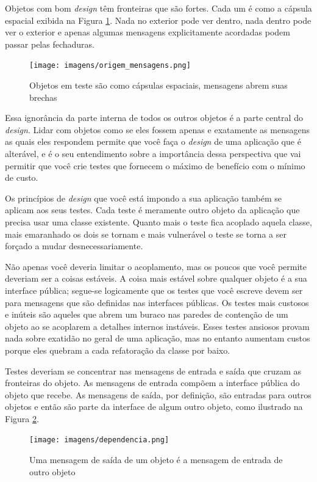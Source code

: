Objetos com bom \textit{design} têm fronteiras que são fortes. Cada um é como a cápsula espacial exibida na Figura \ref{img:origem_mensagens}. Nada no exterior pode ver dentro, nada dentro pode ver o exterior e apenas algumas mensagens explicitamente acordadas podem passar pelas fechaduras.

\begin{figure}[!htbp]
  \center
  \texttt{[image: imagens/origem\_mensagens.png]}
  \caption{Objetos em teste são como cápsulas espaciais, mensagens abrem suas brechas}
  \label{img:origem_mensagens}
\end{figure}

Essa ignorância da parte interna de todos os outros objetos é a parte central do \textit{design}. Lidar com objetos como se eles fossem apenas e exatamente as mensagens as quais eles respondem permite que você faça o \textit{design} de uma aplicação que é alterável, e é o seu entendimento sobre a importância dessa perspectiva que vai permitir que você crie testes que fornecem o máximo de benefício com o mínimo de custo.

Os princípios de \textit{design} que você está impondo a sua aplicação também se aplicam aos seus testes. Cada teste é meramente outro objeto da aplicação que precisa usar uma classe existente. Quanto mais o teste fica acoplado aquela classe, mais emaranhado os dois se tornam e mais vulnerável o teste se torna a ser forçado a mudar desnecessariamente.

Não apenas você deveria limitar o acoplamento, mas os poucos que você permite deveriam ser a coisas estáveis. A coisa mais estável sobre qualquer objeto é a sua interface pública; segue-se logicamente que os testes que você escreve devem ser para mensagens que são definidas nas interfaces públicas. Os testes mais custosos e inúteis são aqueles que abrem um buraco nas paredes de contenção de um objeto ao se acoplarem a detalhes internos instáveis. Esses testes ansiosos provam nada sobre exatidão no geral de uma aplicação, mas no entanto aumentam custos porque eles quebram a cada refatoração da classe por baixo.

Testes deveriam se concentrar nas mensagens de entrada e saída que cruzam as fronteiras do objeto. As mensagens de entrada compõem a interface pública do objeto que recebe. As mensagens de saída, por definição, são entradas para outros objetos e então são parte da interface de algum outro objeto, como ilustrado na Figura \ref{img:dependencia}.

\begin{figure}[!htbp]
  \center
  \texttt{[image: imagens/dependencia.png]}
  \caption{Uma mensagem de saída de um objeto é a mensagem de entrada de outro objeto}
  \label{img:dependencia}
\end{figure}

